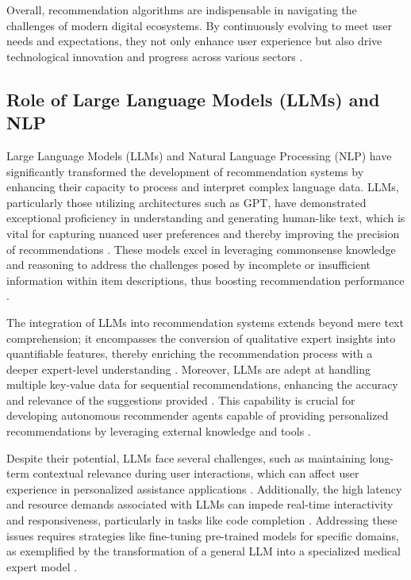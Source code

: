 Overall, recommendation algorithms are indispensable in navigating the challenges of modern digital ecosystems. By continuously evolving to meet user needs and expectations, they not only enhance user experience but also drive technological innovation and progress across various sectors \cite{cui2024distillationmattersempoweringsequential}.



\subsection{Role of Large Language Models (LLMs) and NLP} \label{subsec:Role of Large Language Models (LLMs) and NLP}



Large Language Models (LLMs) and Natural Language Processing (NLP) have significantly transformed the development of recommendation systems by enhancing their capacity to process and interpret complex language data. LLMs, particularly those utilizing architectures such as GPT, have demonstrated exceptional proficiency in understanding and generating human-like text, which is vital for capturing nuanced user preferences and thereby improving the precision of recommendations . These models excel in leveraging commonsense knowledge and reasoning to address the challenges posed by incomplete or insufficient information within item descriptions, thus boosting recommendation performance \cite{lyu2023llm}.



The integration of LLMs into recommendation systems extends beyond mere text comprehension; it encompasses the conversion of qualitative expert insights into quantifiable features, thereby enriching the recommendation process with a deeper expert-level understanding \cite{jing2024translatingexpertintuitionquantifiable}. Moreover, LLMs are adept at handling multiple key-value data for sequential recommendations, enhancing the accuracy and relevance of the suggestions provided \cite{wang2023multiple}. This capability is crucial for developing autonomous recommender agents capable of providing personalized recommendations by leveraging external knowledge and tools \cite{wang2023recmind}.



Despite their potential, LLMs face several challenges, such as maintaining long-term contextual relevance during user interactions, which can affect user experience in personalized assistance applications \cite{rasal2024multillmorchestrationenginepersonalized}. Additionally, the high latency and resource demands associated with LLMs can impede real-time interactivity and responsiveness, particularly in tasks like code completion \cite{zhang2024llm}. Addressing these issues requires strategies like fine-tuning pre-trained models for specific domains, as exemplified by the transformation of a general LLM into a specialized medical expert model \cite{li2024beginnerexpertmodelingmedical}.



